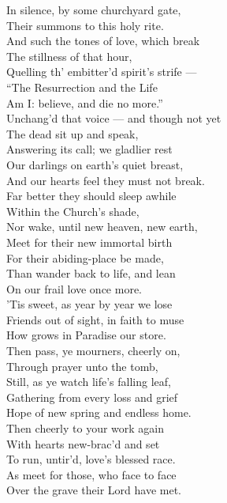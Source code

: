  In silence, by some churchyard gate, \\
 Their summons to this holy rite. \\
  And such the tones of love, which break \\
 The stillness of that hour, \\
 Quelling th’ embitter’d spirit’s strife — \\
 “The Resurrection and the Life \\
 Am I: believe, and die no more.” \\
  Unchang’d that voice — and though not yet \\
 The dead sit up and speak, \\
 Answering its call; we gladlier rest \\
 Our darlings on earth’s quiet breast, \\
 And our hearts feel they must not break. \\
  Far better they should sleep awhile \\
 Within the Church’s shade, \\
 Nor wake, until new heaven, new earth, \\
 Meet for their new immortal birth \\
 For their abiding-place be made, \\
  Than wander back to life, and lean \\
 On our frail love once more. \\
 ’Tis sweet, as year by year we lose \\
 Friends out of sight, in faith to muse \\
 How grows in Paradise our store. \\
  Then pass, ye mourners, cheerly on, \\
 Through prayer unto the tomb, \\
 Still, as ye watch life’s falling leaf, \\
 Gathering from every loss and grief \\
 Hope of new spring and endless home. \\
  Then cheerly to your work again \\
 With hearts new-brac’d and set \\
 To run, untir’d, love’s blessed race. \\
 As meet for those, who face to face \\
 Over the grave their Lord have met.\\


